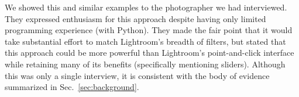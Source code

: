 We showed this and similar examples to the photographer we had interviewed. 
They expressed enthusiasm for this approach despite having only 
limited programming experience (with Python). They made the fair point that it 
would take substantial effort to match Lightroom's breadth of filters, 
but stated that this approach could be more powerful than 
Lightroom's point-and-click interface while retaining many of its benefits (specifically
mentioning sliders). Although this was only a single interview,
it is consistent with the body of evidence summarized in Sec.~\ref{sec:background}.



